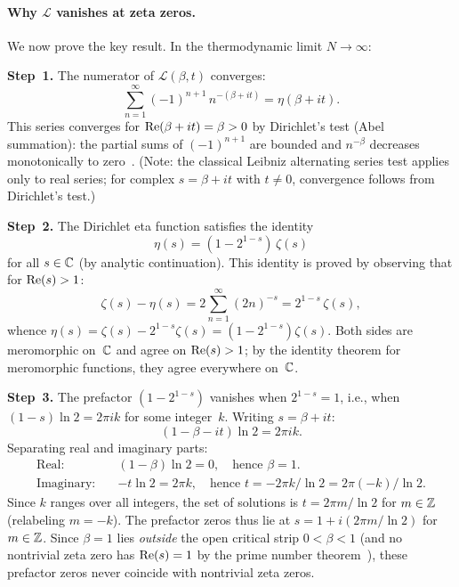 \paragraph{Why $\mathcal{L}$ vanishes at zeta zeros.}
We now prove the key result. In the thermodynamic limit $N \to \infty$:

\medskip\noindent
\textbf{Step~1.} The numerator of $\mathcal{L}(\beta,t)$ converges:
\begin{equation}\label{eq:eta-convergence}
  \sum_{n=1}^{\infty} (-1)^{n+1}\,n^{-(\beta+it)} = \eta(\beta+it).
\end{equation}
This series converges for $\operatorname{Re}(\beta+it) = \beta > 0$ by Dirichlet's test (Abel
summation): the partial sums of $(-1)^{n+1}$ are bounded and $n^{-\beta}$ decreases
monotonically to zero~\cite{titchmarsh1986}. (Note: the classical Leibniz alternating
series test applies only to real series; for complex $s = \beta + it$ with $t \ne 0$,
convergence follows from Dirichlet's test.)

\medskip\noindent
\textbf{Step~2.} The Dirichlet eta function satisfies the identity
\begin{equation}\label{eq:eta-zeta}
  \eta(s) = (1 - 2^{1-s})\,\zeta(s)
\end{equation}
for all $s \in \mathbb{C}$ (by analytic continuation). This identity is proved by observing
that for $\operatorname{Re}(s) > 1$:
\begin{equation}\label{eq:eta-zeta-proof}
  \zeta(s) - \eta(s) = 2\sum_{n=1}^{\infty}(2n)^{-s} = 2^{1-s}\,\zeta(s),
\end{equation}
whence $\eta(s) = \zeta(s) - 2^{1-s}\zeta(s) = (1-2^{1-s})\zeta(s)$. Both sides are
meromorphic on~$\mathbb{C}$ and agree on $\operatorname{Re}(s) > 1$; by the identity theorem for meromorphic
functions, they agree everywhere on~$\mathbb{C}$.

\medskip\noindent
\textbf{Step~3.} The prefactor $(1 - 2^{1-s})$ vanishes when $2^{1-s} = 1$, i.e., when
$(1-s)\ln 2 = 2\pi ik$ for some integer~$k$. Writing $s = \beta + it$:
\begin{equation}\label{eq:prefactor-eq}
  (1 - \beta - it)\ln 2 = 2\pi ik.
\end{equation}
Separating real and imaginary parts:
\begin{align}
  \text{Real:}\quad & (1-\beta)\ln 2 = 0, \quad\text{hence } \beta = 1. \label{eq:pf-real}\\
  \text{Imaginary:}\quad & -t\ln 2 = 2\pi k, \quad\text{hence }
    t = -2\pi k/\ln 2 = 2\pi(-k)/\ln 2. \label{eq:pf-imag}
\end{align}
Since $k$ ranges over all integers, the set of solutions is $t = 2\pi m/\ln 2$ for
$m \in \mathbb{Z}$ (relabeling $m = -k$). The prefactor zeros thus lie at
$s = 1 + i(2\pi m/\ln 2)$ for $m \in \mathbb{Z}$. Since $\beta = 1$ lies \emph{outside} the
open critical strip $0 < \beta < 1$ (and no nontrivial zeta zero has $\operatorname{Re}(s) = 1$
by the prime number theorem~\cite{titchmarsh1986}), these prefactor zeros never
coincide with nontrivial zeta zeros.

